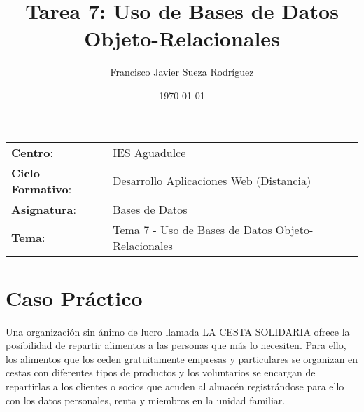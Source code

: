 


\title{
\vspace{10ex}
\normalfont \normalsize
\Huge \textbf{Tarea 7: Uso de Bases de Datos Objeto-Relacionales}
}
\author{Francisco Javier Sueza Rodríguez}
\date{\normalsize\today}



\maketitle

\thispagestyle{empty}

\vspace{62ex}

\begin{center}
    \begin{tabular}{l l}
        \textbf{Centro}: & IES Aguadulce \\
        \textbf{Ciclo Formativo}: & Desarrollo Aplicaciones Web (Distancia)\\
        \textbf{Asignatura}: & Bases de Datos\\
        \textbf{Tema}: & Tema 7 - Uso de Bases de Datos Objeto-Relacionales\\
    \end{tabular}
\end{center}

\newpage

\tableofcontents

\newpage

\listoffigures

\newpage

\section{Caso Práctico}
Una organización sin ánimo de lucro llamada LA CESTA SOLIDARIA ofrece la posibilidad de repartir alimentos a las personas que más lo necesiten. Para ello, los alimentos que los ceden gratuitamente empresas y particulares se organizan en cestas con diferentes tipos de productos y los voluntarios se encargan de repartirlas a los clientes o socios que acuden al almacén registrándose para ello con los datos personales, renta y miembros en la unidad familiar.

